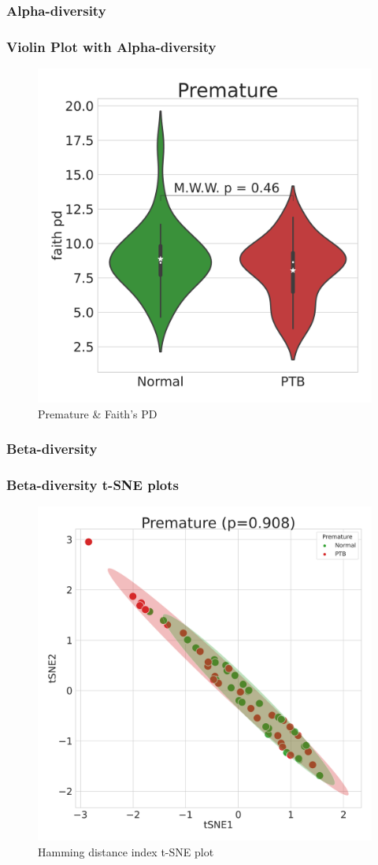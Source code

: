 \documentclass{beamer}
\begin{document}
    \subsubsection{Alpha-diversity}
    \begin{frame}
        \frametitle{Violin Plot with Alpha-diversity}

        \begin{figure}
            \includegraphics[width=0.5 \linewidth]{figures/AlphaDiversity/singleton.DADA2/Mouth+Premature+faith_pd.pdf}
            \caption{Premature \& Faith's PD}
        \end{figure}
    \end{frame}

    \subsubsection{Beta-diversity}
    \begin{frame}[allowframebreaks]
        \frametitle{Beta-diversity t-SNE plots}

        \begin{figure}
            \includegraphics[width=0.5 \linewidth]{figures/BetaDiversity/singleton.DADA2.homd.uncorrected/Mouth+Premature+hamming.pdf}
            \caption{Hamming distance index t-SNE plot}
        \end{figure}
    \end{frame}
\end{document}
